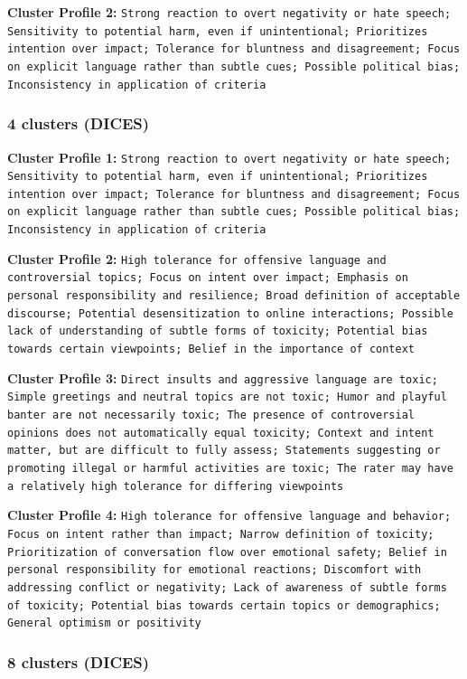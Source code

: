 \documentclass[11pt]{article}
\begin{document}
\textbf{Cluster Profile 2:} \texttt{Strong reaction to overt negativity or hate speech; Sensitivity to potential harm, even if unintentional; Prioritizes intention over impact; Tolerance for bluntness and disagreement; Focus on explicit language rather than subtle cues; Possible political bias; Inconsistency in application of criteria}

\subsubsection{4 clusters (DICES)}

\textbf{Cluster Profile 1:} \texttt{Strong reaction to overt negativity or hate speech; Sensitivity to potential harm, even if unintentional; Prioritizes intention over impact; Tolerance for bluntness and disagreement; Focus on explicit language rather than subtle cues; Possible political bias; Inconsistency in application of criteria}

\textbf{Cluster Profile 2:} \texttt{High tolerance for offensive language and controversial topics; Focus on intent over impact; Emphasis on personal responsibility and resilience; Broad definition of acceptable discourse; Potential desensitization to online interactions; Possible lack of understanding of subtle forms of toxicity; Potential bias towards certain viewpoints; Belief in the importance of context}

\textbf{Cluster Profile 3:} \texttt{Direct insults and aggressive language are toxic; Simple greetings and neutral topics are not toxic; Humor and playful banter are not necessarily toxic; The presence of controversial opinions does not automatically equal toxicity; Context and intent matter, but are difficult to fully assess; Statements suggesting or promoting illegal or harmful activities are toxic; The rater may have a relatively high tolerance for differing viewpoints}

\textbf{Cluster Profile 4:} \texttt{High tolerance for offensive language and behavior; Focus on intent rather than impact; Narrow definition of toxicity; Prioritization of conversation flow over emotional safety; Belief in personal responsibility for emotional reactions; Discomfort with addressing conflict or negativity; Lack of awareness of subtle forms of toxicity; Potential bias towards certain topics or demographics; General optimism or positivity}

\subsubsection{8 clusters (DICES)}
\end{document}
